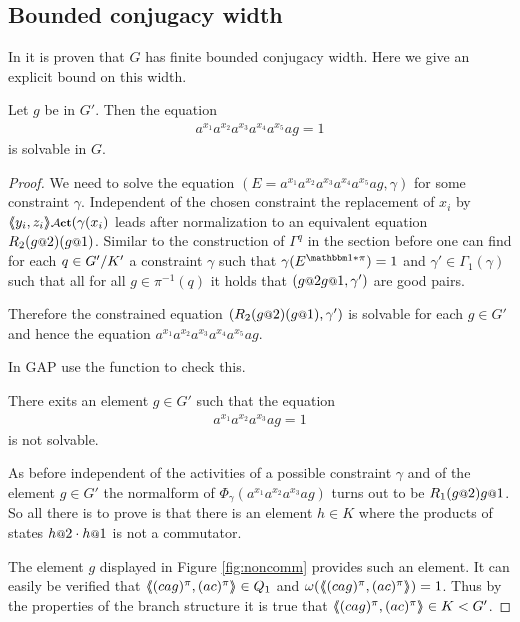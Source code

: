 \documentclass[a4paper,11pt]{amsart}
\begin{document}
\subsection{Bounded conjugacy width}
In \cite{Fink:Conjugacy_growth} it is proven that $G$ has finite bounded conjugacy width. Here we give an explicit bound 
on this width.
\begin{pro}
 Let $g$ be in $G'$. Then the equation 
 \begin{align*}
  a^{x_1}a^{x_2}a^{x_3}a^{x_4}a^{x_5}ag=1
 \end{align*}
is solvable in $G$. 
\end{pro}
\begin{proof}
We need to solve the equation $(E=a^{x_1}a^{x_2}a^{x_3}a^{x_4}a^{x_5}ag,\gamma)$ for
some constraint $\gamma$. Independent of the chosen constraint the replacement of
$x_i$ by $\pair{y_i,z_i}\act(\gamma(x_i)$ leads after normalization to an equivalent equation 
$R_2(g\at{2})(g\at{1})$. Similar to the construction of $\Gamma^q$ in the section
before one can find for each $q\in{G'/K'}$ a constraint $\gamma$ such that
$\gamma(E^{\id*\pi})=1$ and $\gamma'\in\Gamma_1(\gamma)$ such that all for all 
$g\in\pi^{-1}(q)$ it holds that $(g\at{2}g\at{1},\gamma')$ are good pairs.

Therefore the constrained equation $(R_2(g\at{2})(g\at{1}),\gamma')$ is solvable
for each $g\in G'$ and hence the equation $a^{x_1}a^{x_2}a^{x_3}a^{x_4}a^{x_5}ag$.

In GAP use the function  to check this.
\begin{lem}
 There exits an element $g\in G'$ such that the equation 
 \begin{align*}
  a^{x_1}a^{x_2}a^{x_3}ag=1
 \end{align*}
 is not solvable.
\end{lem}
As before independent of the activities of a possible constraint $\gamma$ and of the element $g\in G'$
the normalform of $\Phi_\gamma(a^{x_1}a^{x_2}a^{x_3}ag)$ turns out to
be $R_1(g\at{2}) g\at{1}$. So all there is to prove is that there is an element $h\in K$
where the products of states $h\at{2}\cdot h\at{1}$ is not a commutator.

The element $g$ displayed in Figure \ref{fig:noncomm} provides such an element. It can easily be verified 
that $\langle\negthickspace\langle(cag)^\pi,(ac)^\pi\rangle\negthickspace\rangle\in Q_1$ and $\omega(\langle\negthickspace\langle(cag)^\pi,(ac)^\pi\rangle\negthickspace\rangle)=1$. Thus by
the properties of the branch structure it is true that $\langle\negthickspace\langle(cag)^\pi,(ac)^\pi\rangle\negthickspace\rangle\in K<G'$. 
\end{proof}
\end{document}
